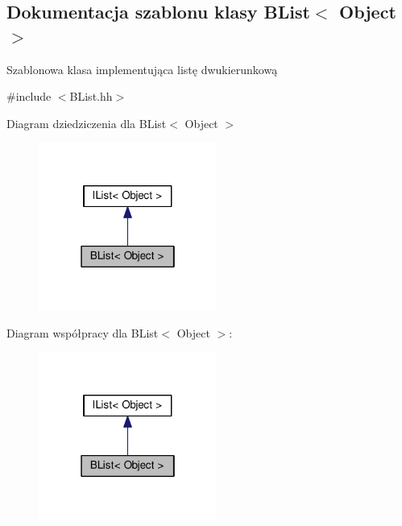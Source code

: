 \hypertarget{class_b_list}{\subsection{Dokumentacja szablonu klasy B\-List$<$ Object $>$}
\label{class_b_list}
}


Szablonowa klasa implementująca listę dwukierunkową  




{\ttfamily \#include $<$B\-List.\-hh$>$}



Diagram dziedziczenia dla B\-List$<$ Object $>$
\nopagebreak
\begin{figure}[H]
\begin{center}
\leavevmode
\includegraphics[width=166pt]{class_b_list__inherit__graph}
\end{center}
\end{figure}


Diagram współpracy dla B\-List$<$ Object $>$\-:
\nopagebreak
\begin{figure}[H]
\begin{center}
\leavevmode
\includegraphics[width=166pt]{class_b_list__coll__graph}
\end{center}
\end{figure}

